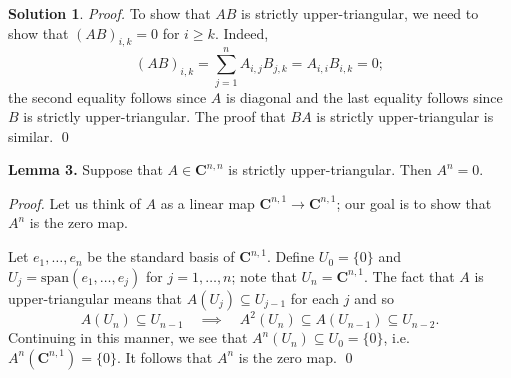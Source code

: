 \documentclass[12pt]{article}
\theoremstyle{definition}
\theoremstyle{exercise}
\theoremstyle{solution}
\newtheorem*{solution}{Solution}
\newcommand{\Span}{\text{span}}
\newcommand{\C}{\mathbf{C}}
\begin{document}
\begin{solution}
    \vspace{2mm}

    \noindent \textit{Proof.} To show that \( AB \) is strictly upper-triangular, we need to show that \( (AB)_{i,k} = 0 \) for \( i \geq k \). Indeed,
    \[
        (AB)_{i,k} = \sum_{j=1}^n A_{i,j} B_{j,k} = A_{i,i} B_{i,k} = 0;
    \]
    the second equality follows since \( A \) is diagonal and the last equality follows since \( B \) is strictly upper-triangular. The proof that \( BA \) is strictly upper-triangular is similar. \qed

    \vspace{2mm}

    \noindent \textbf{Lemma 3.} Suppose that \( A \in \C^{n,n} \) is strictly upper-triangular. Then \( A^n = 0 \).

    \vspace{2mm}

    \noindent \textit{Proof.} Let us think of \( A \) as a linear map \( \C^{n,1} \to \C^{n,1} \); our goal is to show that \( A^n \) is the zero map.

    Let \( e_1, \ldots, e_n \) be the standard basis of \( \C^{n,1} \). Define \( U_0 = \{ 0 \} \) and \( U_j = \Span(e_1, \ldots, e_j) \) for \( j = 1, \ldots, n \); note that \( U_n = \C^{n,1} \). The fact that \( A \) is upper-triangular means that \( A(U_j) \subseteq U_{j-1} \) for each \( j \) and so
    \[
        A(U_n) \subseteq U_{n-1} \quad \implies \quad A^2(U_n) \subseteq A(U_{n-1}) \subseteq U_{n-2}.
    \]
    Continuing in this manner, we see that \( A^n (U_n) \subseteq U_0 = \{ 0 \} \), i.e.\ \( A^n (\C^{n,1}) = \{ 0 \} \). It follows that \( A^n \) is the zero map. \qed


\end{solution}
\end{document}
